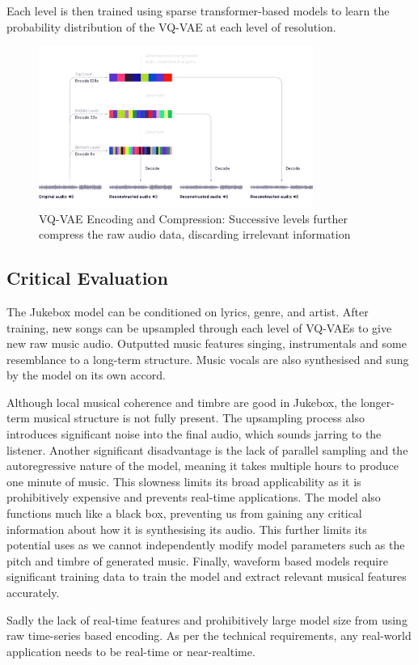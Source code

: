 Each level is then trained using sparse transformer-based models to learn the probability distribution of the VQ-VAE at each level of resolution.

\begin{figure}[H]
    \centering
    \includegraphics[width=0.8\textwidth]{literature_review/vq-vae.png}
    \caption{VQ-VAE Encoding and Compression: Successive levels further compress the raw audio data, discarding irrelevant information}
    \label{fig:jukebox_example}
\end{figure}

\subsection{Critical Evaluation}

The Jukebox model can be conditioned on lyrics, genre, and artist. After training, new songs can be upsampled through each level of VQ-VAEs to give new raw music audio. Outputted music features singing, instrumentals and some resemblance to a long-term structure. Music vocals are also synthesised and sung by the model on its own accord.

Although local musical coherence and timbre are good in Jukebox, the longer-term musical structure is not fully present. The upsampling process also introduces significant noise into the final audio, which sounds jarring to the listener. Another significant disadvantage is the lack of parallel sampling and the autoregressive nature of the model, meaning it takes multiple hours to produce one minute of music. This slowness limits its broad applicability as it is prohibitively expensive and prevents real-time applications. The model also functions much like a black box, preventing us from gaining any critical information about how it is synthesising its audio. This further limits its potential uses as we cannot independently modify model parameters such as the pitch and timbre of generated music. Finally, waveform based models require significant training data to train the model and extract relevant musical features accurately.

Sadly the lack of real-time features and prohibitively large model size from using raw time-series based encoding. As per the technical requirements, any real-world application needs to be real-time or near-realtime.